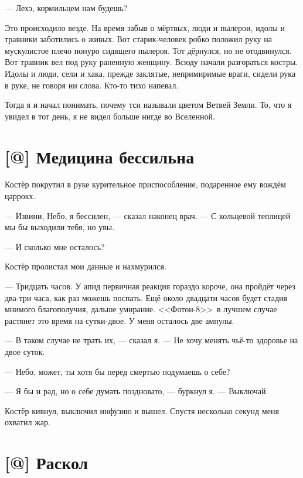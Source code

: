 --- Лехэ, кормильцем нам будешь?

Это происходило везде.
На время забыв о мёртвых, люди и пылерои, идолы и травники заботились о живых.
Вот старик-человек робко положил руку на мускулистое плечо понуро сидящего пылероя.
Тот дёрнулся, но не отодвинулся.
Вот травник вел под руку раненную женщину.
Всюду начали разгораться костры.
Идолы и люди, сели и хака, прежде заклятые, непримиримые враги, сидели рука в руке, не говоря ни слова.
Кто-то тихо напевал.

Тогда я и начал понимать, почему тси называли цветом Ветвей Земли.
То, что я увидел в тот день, я не видел больше нигде во Вселенной.

\section{[@] Медицина бессильна}

\textspace

Костёр покрутил в руке курительное приспособление, подаренное ему вождём царрокх.

--- Извини, Небо, я бессилен, --- сказал наконец врач.
--- С кольцевой теплицей мы бы выходили тебя, но увы.

--- И сколько мне осталось?

Костёр пролистал мои данные и нахмурился.

--- Тридцать часов.
У апид первичная реакция гораздо короче, она пройдёт через два-три часа, как раз можешь поспать.
Ещё около двадцати часов будет стадия мнимого благополучия, дальше умирание.
<<Фотон-8>>\FM\ в лучшем случае растянет это время на сутки-двое.
У меня осталось две ампулы.

--- В таком случае не трать их, --- сказал я.
--- Не хочу менять чьё-то здоровье на двое суток.

--- Небо, может, ты хотя бы перед смертью подумаешь о себе?

--- Я бы и рад, но о себе думать поздновато, --- буркнул я.
--- Выключай.

Костёр кивнул, выключил инфузию и вышел.
Спустя несколько секунд меня охватил жар.

\section{[@] Раскол}

